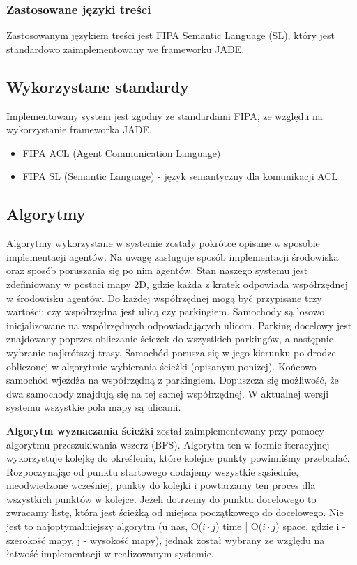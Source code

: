 \subsubsection{Zastosowane języki treści}
Zastosowanym językiem treści jest FIPA Semantic Language (SL), który jest standardowo zaimplementowany we frameworku JADE.

\subsection{Wykorzystane standardy}

Implementowany system jest zgodny ze standardami FIPA, ze względu na wykorzystanie frameworka JADE.

\begin{itemize}
\item FIPA ACL (Agent Communication Language)
\item FIPA SL (Semantic Language) - język semantyczny dla komunikacji ACL

\end{itemize}


\subsection{Algorytmy}

Algorytmy wykorzystane w systemie zostały pokrótce opisane w sposobie implementacji agentów. Na uwagę zasługuje sposób implementacji środowiska oraz sposób poruszania się po nim agentów. Stan naszego systemu jest zdefiniowany w postaci mapy 2D, gdzie każda z kratek odpowiada współrzędnej w środowisku agentów. Do każdej współrzędnej mogą być przypisane trzy wartości: czy współrzędna jest ulicą czy parkingiem. Samochody są losowo inicjalizowane na współrzędnych odpowiadających ulicom. Parking docelowy jest znajdowany poprzez obliczanie ścieżek do wszystkich parkingów, a następnie wybranie najkrótszej trasy. Samochód porusza się w jego kierunku po drodze obliczonej w algorytmie wybierania ścieżki (opisanym poniżej). Końcowo samochód wjeżdża na współrzędną z parkingiem. Dopuszcza się możliwość, że dwa samochody znajdują się na tej samej współrzędnej. W aktualnej wersji systemu wszystkie pola mapy są ulicami.

\textbf{Algorytm wyznaczania ścieżki} został zaimplementowany przy pomocy algorytmu przeszukiwania wszerz (BFS). Algorytm ten w formie iteracyjnej wykorzystuje kolejkę do określenia, które kolejne punkty powinniśmy przebadać. Rozpoczynając od punktu startowego dodajemy wszystkie sąsiednie, nieodwiedzone wcześniej, punkty do kolejki i powtarzamy ten proces dla wszystkich punktów w kolejce. Jeżeli dotrzemy do punktu docelowego to zwracamy listę, która jest ścieżką od miejsca początkowego do docelowego. Nie jest to najoptymalniejszy algorytm (u nas, O($ i \cdot j $) time | O($ i \cdot j $) space, gdzie i - szerokość mapy, j - wysokość mapy), jednak został wybrany ze względu na łatwość implementacji w realizowanym systemie.

